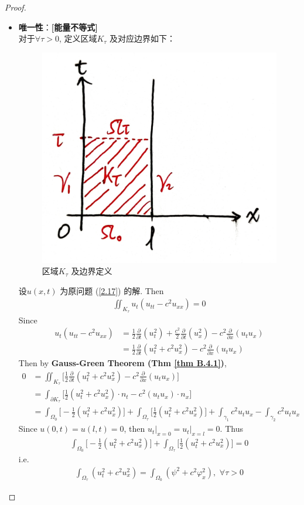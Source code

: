 \begin{thm}
\begin{proof}
\begin{itemize}
				\newpage
				
				\item \textbf{唯一性}：\textbf{[能量不等式]}	\\
				对于$\forall \tau > 0$, 定义区域$K_\tau$ 及对应边界如下：
				
				\begin{figure}[thbp!]
					\centering
					\includegraphics[width=0.28\linewidth]{figure/2.3-6}
					\caption{区域$K_\tau$ 及边界定义}
					\label{pic : 2.3-6} %
				\end{figure}
				
				设$u(x , t)$ 为原问题 (\ref{2.17}) 的解. Then
				\begin{align*}
					\iint_{K_\tau} u_t (u_{tt} - c^2 u_{xx}) = 0
				\end{align*}
				Since
				\begin{align*}
					u_t(u_{tt} - c^2 u_{xx}) 
					&= \frac{1}{2} \frac{\partial}{\partial t} (u_{t}^2) + \frac{c^2}{2} \frac{\partial}{\partial t} (u_{x}^2) - c^2 \frac{\partial}{\partial x}(u_t u_x) \\
					&= \frac{1}{2} \frac{\partial}{\partial t}(u_{t}^2 + c^2 u_{x}^2) - c^2 \frac{\partial}{\partial x} (u_t u_x)
				\end{align*}
				Then by \textbf{Gauss-Green Theorem (Thm \ref{thm B.4.1})}, 
				\begin{align*}
					0 
					&= \iint_{K_\tau} \Big[ \frac{1}{2} \frac{\partial}{\partial t}(u_{t}^2 + c^2 u_{x}^2) - c^2 \frac{\partial}{\partial x} (u_t u_x) \Big] \\
					&= \int_{\partial K_\tau} \Big[ \frac{1}{2} (u_{t}^2 + c^2 u_{x}^2) \cdot n_t - c^2 (u_t u_x) \cdot n_x \Big] \\
					&= \int_{\Omega_0} \Big[ -\frac{1}{2} (u_{t}^2 + c^2 u_{x}^2) \Big] 
					+ \int_{\Omega_\tau} \Big[ \frac{1}{2} (u_{t}^2 + c^2 u_{x}^2) \Big] 
					+ \int_{\gamma_1} c^2 u_t u_x 
					- \int_{\gamma_2} c^2 u_t u_x
				\end{align*}
				Since $u(0 , t) = u(l , t) = 0$, then $u_t \Big|_{x = 0} = u_t \Big|_{x = l} = 0$. Thus
				\begin{align*}
					\int_{\Omega_0} \Big[ -\frac{1}{2} (u_{t}^2 + c^2 u_{x}^2) \Big] 
					+ \int_{\Omega_\tau} \Big[ \frac{1}{2} (u_{t}^2 + c^2 u_{x}^2) \Big] 
					= 0
				\end{align*}
				i.e. 
				\begin{align*}
					\int_{\Omega_\tau} (u_{t}^2 + c^2 u_{x}^2) = \int_{\Omega_0} (\psi^2 + c^2 \varphi_{x}^2) , \,\, \forall \tau > 0
				\end{align*}
				

\end{itemize}
\end{proof}
\end{thm}
